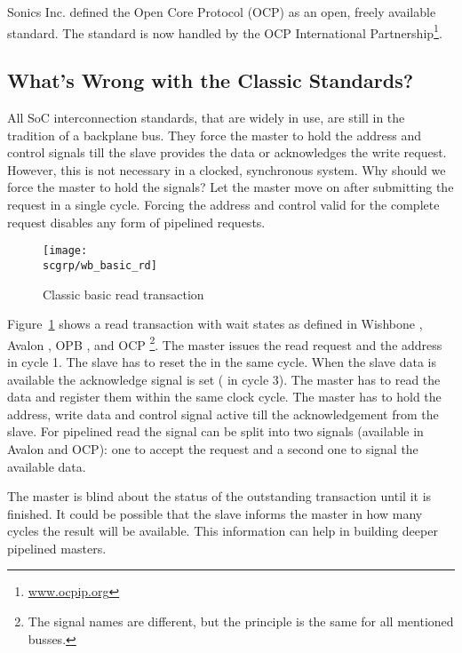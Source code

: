 Sonics Inc. defined the Open Core Protocol (OCP) \cite{soc:ocp} as
an open, freely available standard. The standard is now handled by
the OCP International Partnership\footnote{\url{www.ocpip.org}}.




\subsection{What's Wrong with the Classic Standards?}

All SoC interconnection standards, that are widely in use, are still
in the tradition of a backplane bus. They force the master to hold
the address and control signals till the slave provides the data or
acknowledges the write request. However, this is not necessary in a
clocked, synchronous system. Why should we force the master to hold
the signals? Let the master move on after submitting the request in
a single cycle. Forcing the address and control valid for the
complete request disables any form of pipelined requests.


\begin{figure}
    \centering
    \texttt{[image: \\scgrp/wb\_basic\_rd]}
    \caption{Classic basic read transaction}
    \label{fig:wb:basic:rd}
\end{figure}

Figure~\ref{fig:wb:basic:rd} shows a read transaction with wait
states as defined in Wishbone \cite{soc:wishbone}, Avalon
\cite{soc:avalon}, OPB \cite{soc:opb}, and OCP
\cite{soc:ocp}\footnote{The signal names are different, but the
principle is the same for all mentioned busses.}. The master issues
the read request and the address in cycle 1. The slave has to reset
the  in the same cycle. When the slave data is available
the acknowledge signal is set ( in cycle 3). The master
has to read the data and register them within the same clock cycle.
The master has to hold the address, write data and control signal
active till the acknowledgement from the slave. For pipelined read
the  signal can be split into two signals (available in
Avalon and OCP): one to accept the request and a second one to
signal the available data.

The master is blind about the status of the outstanding transaction
until it is finished. It could be possible that the slave informs
the master in how many cycles the result will be available. This
information can help in building deeper pipelined masters.


